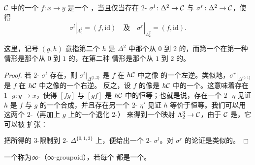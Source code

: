 \begin{lemma}\label{lem:equivalence-2-simplices}
\trInfinityCategory{} $\mathcal{C}$ 中的一个\trMorphism{} $f\colon x \to y$ 是一个%
\trEquivalence{}，当且仅当存在 $2$-\trSimplex{} $\sigma^l\colon \Delta^2 \to \mathcal{C}$ 与
$\sigma^r\colon \Delta^2 \to \mathcal{C}$，使得
\[
\sigma^l|_{\Lambda^2_0} = (f, \mathrm{id})
\quad\text{及}\quad
\sigma^r|_{\Lambda^2_2} = (f, \mathrm{id}).
\]
\end{lemma}

这里，记号 $(g, h)$ 意指第二个\trMorphism{} $h$ 是 $\Delta^2$ 中那个从 $0$ 到 $2$
的\trMorphism{}，而第一个\trMorphism{}在第一种情形是那个从 $0$ 到 $1$ 的，在第二种
情形是那个从 $1$ 到 $2$ 的。

\begin{proof}
若 $2$-\trSimplex{} $\sigma^l$ 存在，则 $\sigma^l|_{\Delta^{\{1,2\}}}$ 是 $f$ 在 $h\mathcal{C}$ 中之像
的一个左逆。类似地，$\sigma^r|_{\Delta^{\{0,1\}}}$ 是 $f$ 在 $h\mathcal{C}$ 中之像的一个右逆。
反之，设 $f$ 的像是 $h\mathcal{C}$ 中的一个\trEquivalence{}。这意味着存在 $1$-\trSimplex{}%
$g\colon y \to x$，使得 $[fg]$ 与 $[gf]$ 是 $h\mathcal{C}$ 中的恒等；也就是说，存在一个
$2$-\trSimplex{} $\eta$ 见证 $h$ 是 $f$ 与 $g$ 的一个合成，并且存在另一个 $2$-\trSimplex{} $\eta'$
见证 $h$ 等价于恒等。我们可以用这两个 $2$-\trSimplex{}（再加上 $g$ 上的一个退化 $2$-\trSimplex{}）
来得到一个映射 $\Lambda^3_2 \to \mathcal{C}$，由于 $\mathcal{C}$ 是\trInfinityCategory{}，它可以被
扩张：
\begin{center}
\end{center}
把所得的 $3$-\trSimplex{}限制到 $2$-\trSimplex{} $\Delta^{\{0,1,3\}}$ 上，便给出一个 $2$-\trSimplex{}%
$\sigma^l$。对 $\sigma^r$ 的论证是类似的。
\end{proof}

\begin{definition}\label{def:infinity-groupoid}
一个\trInfinityCategory{}称为\emph{∞-\trGroupoid{}}（∞-groupoid），若每个%
\trMorphism{}都是一个\trEquivalence{}。
\end{definition}

